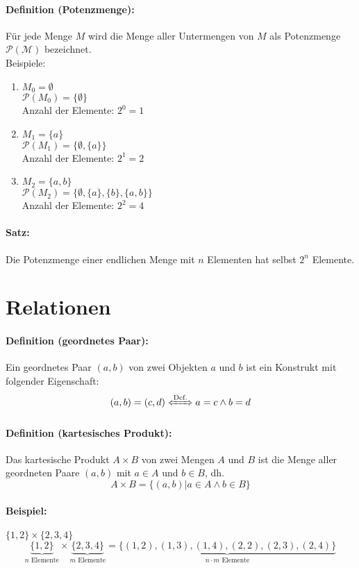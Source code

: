 \paragraph{Definition (Potenzmenge):}Für jede Menge $M$ wird die Menge aller Untermengen von $M$ als Potenzmenge $\mathcal{P(M)}$ bezeichnet.\\

Beispiele:
\begin{enumerate}
\item $M_0=\emptyset$ \\
$\mathcal{P}(M_0)=\{\emptyset\}$ \\
Anzahl der Elemente: $2^0=1$
\item $M_1=\{a\}$\\
$\mathcal{P}(M_1)=\{\emptyset,\{a\}\}$ \\
Anzahl der Elemente: $2^1=2$
\item $M_2=\{a,b\}$ \\
$\mathcal{P}(M_2)=\{\emptyset,\{a\},\{b\},\{a,b\}\}$ \\
Anzahl der Elemente: $2^2=4$
\end{enumerate}

\paragraph{Satz:}Die Potenzmenge einer endlichen Menge mit $n$ Elementen hat selbst $2^n$ Elemente.

\section{Relationen}
\paragraph{Definition (geordnetes Paar):}Ein geordnetes Paar $(a,b)$ von zwei Objekten $a$ und $b$ ist ein Konstrukt mit folgender Eigenschaft:
\[
(a,b) = (c,d) \xLeftrightarrow{\text{Def.}} a=c \land b=d
\]
\paragraph{Definition (kartesisches Produkt):}Das kartesische Produkt $A\times B$ von zwei Mengen $A$ und $B$ ist die Menge aller geordneten Paare $(a,b)$ mit $a\in A$ und $b\in B$, dh.
\[
A\times B = \{(a,b) | a\in A \land b\in B\}
\]

\paragraph{Beispiel:}$\{1,2\}\times \{2,3,4\}$
\[
\underbrace{ \{1,2\} }_{n\text{ Elemente}} \times \underbrace{ \{2,3,4\} }_{m\text{ Elemente}} = \underbrace{ \{ (1,2), (1,3), (1,4), (2,2), (2,3), (2,4) \} }_{n\cdot m\text{ Elemente}}
\]

